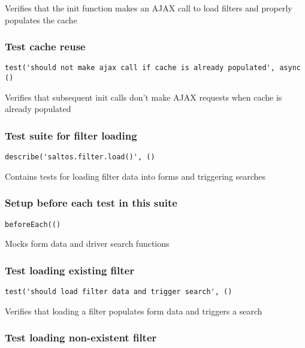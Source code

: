 \documentclass[a4paper]{article}
\begin{document}
Verifies that the init function makes an AJAX call to load filters
and properly populates the cache

\hypertarget{toc152}{}
\subsubsection{Test cache reuse}

\begin{lstlisting}
test('should not make ajax call if cache is already populated', async ()
\end{lstlisting}

Verifies that subsequent init calls don't make AJAX requests
when cache is already populated

\hypertarget{toc153}{}
\subsubsection{Test suite for filter loading}

\begin{lstlisting}
describe('saltos.filter.load()', ()
\end{lstlisting}

Contains tests for loading filter data into forms and triggering searches

\hypertarget{toc154}{}
\subsubsection{Setup before each test in this suite}

\begin{lstlisting}
beforeEach(()
\end{lstlisting}

Mocks form data and driver search functions

\hypertarget{toc155}{}
\subsubsection{Test loading existing filter}

\begin{lstlisting}
test('should load filter data and trigger search', ()
\end{lstlisting}

Verifies that loading a filter populates form data
and triggers a search

\hypertarget{toc156}{}
\subsubsection{Test loading non-existent filter}
\end{document}
